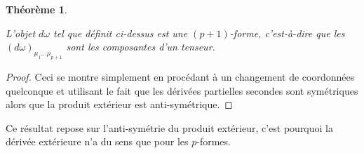 \documentclass[a4paper,11pt]{report}
\theoremstyle{definition}
\theoremstyle{plain}
\newtheorem{thm}{Théorème}[chapter]
\theoremstyle{definition}
\theoremstyle{remark}
\begin{document}
            \begin{thm}\begin{leftbar}
                L'objet $d\omega$ tel que définit ci-dessus est une $(p+1)$-forme, c'est-à-dire que les $(d\omega)_{\mu_1 \dots\mu_{p+1}}$ sont les composantes d'un tenseur.
            \end{leftbar}\end{thm}
            
            \begin{proof}
                Ceci se montre simplement en procédant à un changement de coordonnées quelconque et utilisant le fait que les dérivées partielles secondes sont symétriques alors que la produit extérieur est anti-symétrique.
            \end{proof}
            
            Ce résultat repose sur l'anti-symétrie du produit extérieur, c'est pourquoi la dérivée extérieure n'a du sens que pour les $p$-formes.
            
\end{document}
